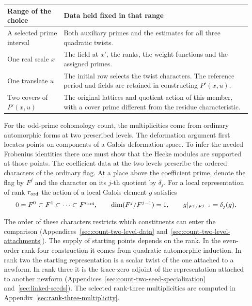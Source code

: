 \begin{construction}
\begin{tabular}{@{}>{\raggedright\arraybackslash}p{.31\linewidth}>{\raggedright\arraybackslash}p{.60\linewidth}@{}}
\toprule
Range of the choice & Data held fixed in that range \\
\midrule
A selected prime interval & Both auxiliary primes and the estimates for all three quadratic twists.\\
One real scale \(x\) & The field at \(x'\), the ranks, the weight functions and the assigned primes.\\
One translate \(u\) & The initial row selects the twist characters. The reference period and fields are retained in constructing \(P'(x,u)\).\\
Two covers of \(P'(x,u)\) & The original lattices and quotient action of this member, with a cover prime different from the residue characteristic.\\
\bottomrule
\end{tabular}
\caption{Choices shared by the translate average and the two division estimates. The field can change with the real scale; the comparison at each translate retains the field and ranks chosen at that scale.}\label{fig:intro-family-choices}
\end{construction}

For the odd-prime cohomology count, the multiplicities come from
ordinary automorphic forms at two prescribed levels. The deformation
argument first locates points on components of a Galois deformation
space. To infer the needed Frobenius identities there one must show
that the Hecke modules are supported at those points.
The coefficient data at the two levels prescribe the ordered characters
of the ordinary flag. At a place above the coefficient prime, denote
the flag by \(F^j\) and the character on its \(j\)-th quotient by
\(\delta_j\). For a local representation of rank \(r_{\rm ord}\) the action of
a local Galois element \(g\) satisfies
\[
   0=F^0\subset F^1\subset\cdots\subset F^{r_{\rm ord}},\qquad
   \dim(F^j/F^{j-1})=1,\qquad
   g|_{F^j/F^{j-1}}=\delta_j(g).
\]

The order of these characters restricts which constituents can enter
the comparison (Appendices~\ref{sec:count-two-level-data}
and~\ref{sec:count-two-level-attachments}). The supply of starting
points depends on the rank. In the even-order rank-four construction
it comes from quadratic automorphic induction. In rank two the starting representation is a scalar twist of the one
attached to a newform. In rank three it is the trace-zero adjoint
of the representation attached to another newform
(Appendices~\ref{sec:count-two-seed-specialization} and~\ref{sec:linked-seeds}).
The selected rank-three multiplicities are computed in
Appendix~\ref{sec:rank-three-multiplicity}.

